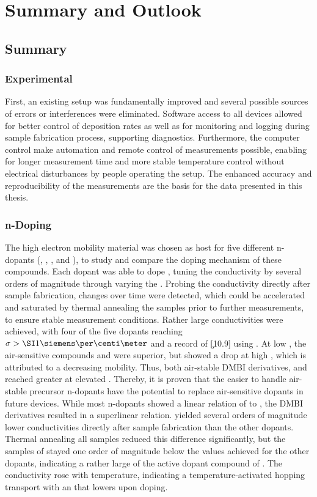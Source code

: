 \chapter{Summary and Outlook}\label{chap:summary}

\section{Summary}

\subsection*{Experimental}
First, an existing setup was fundamentally improved and several possible sources of errors or interferences were eliminated. Software access to all devices allowed for better control of deposition rates as well as for monitoring and logging during sample fabrication process, supporting diagnostics.
Furthermore, the computer control make automation and remote control of measurements possible, enabling for longer measurement time and more stable temperature control without electrical disturbances by people operating the setup. The enhanced accuracy and reproducibility of the measurements are the basis for the data presented in this thesis.

\subsection*{n-Doping}
The high electron mobility material \CS was chosen as host for five different n-dopants (\CrPd, \WPd, \aob, \dmbi and \meodmbiI), to study and compare the doping mechanism of these compounds.
Each dopant was able to dope \CS, tuning the conductivity by several orders of magnitude through varying the \CLong.
Probing the conductivity directly after sample fabrication, changes over time were detected, which could be accelerated and saturated by thermal annealing the samples prior to further measurements, to ensure stable measurement conditions.
%
Rather large conductivities were achieved, with four of the five dopants reaching \mbox{$\c>\Scm{1}$} and a record of \c[10.9] using \meodmbiI.
At low \CLongs, the air-sensitive compounds \CrPd and \WPd were superior, but showed a drop at high \CLongs, which is attributed to a decreasing mobility. Thus, both air-stable DMBI derivatives, \dmbi and \meodmbiI reached greater \cLongs at elevated \CLongs.
%
Thereby, it is proven that the easier to handle air-stable precursor n-dopants have the potential to replace air-sensitive dopants in future devices.
%
While most n-dopants showed a linear relation of \cLong to \CLong, the DMBI derivatives resulted in a superlinear relation.
%
\aob yielded several orders of magnitude lower conductivities directly after sample fabrication than the other dopants. Thermal annealing all samples reduced this difference significantly, but the samples of \aob stayed one order of magnitude below the values achieved for the other dopants, indicating a rather large \IE of the active dopant compound of \aob.
%
The conductivity rose with temperature, indicating a temperature-activated hopping transport with an \EactLong that lowers upon doping.

